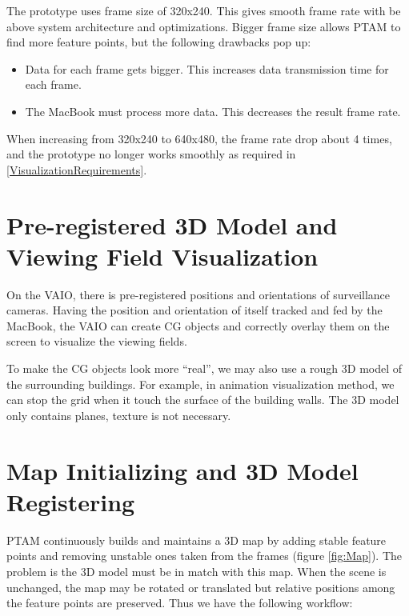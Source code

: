 The prototype uses frame size of 320x240. This gives smooth frame rate with be above system architecture and optimizations. Bigger frame size allows PTAM to find more feature points, but the following drawbacks pop up:

\begin{itemize}
	\item Data for each frame gets bigger. This increases data transmission time for each frame.
	\item The MacBook must process more data. This decreases the result frame rate.
\end{itemize}

When increasing from 320x240 to 640x480, the frame rate drop about 4 times, and the prototype no longer works smoothly as required in \ref{VisualizationRequirements}. 


\section{Pre-registered 3D Model and Viewing Field Visualization}
\label{3DModel}

On the VAIO, there is pre-registered positions and orientations of surveillance cameras. Having the position and orientation of itself tracked and fed by the MacBook, the VAIO can create CG objects and correctly overlay them on the screen to visualize the viewing fields.

To make the CG objects look more ``real'', we may also use a rough 3D model of the surrounding buildings. For example, in animation visualization method, we can stop the grid when it touch the surface of the building walls. The 3D model only contains planes, texture is not necessary.


\section{Map Initializing and 3D Model Registering}

PTAM continuously builds and maintains a 3D map by adding stable feature points and removing unstable ones taken from the frames (figure \ref{fig:Map}). The problem is the 3D model must be in match with this map. When the scene is unchanged, the map may be rotated or translated but relative positions among the feature points are preserved. Thus we have the following workflow:

